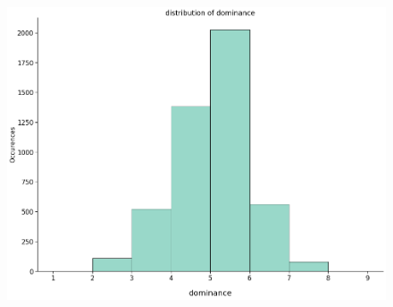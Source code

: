 \documentclass[a4paper,11pt,dvipsnames]{article}
\begin{document}
\begin{figure}[ht]
\begin{minipage}[b]{.3\linewidth}
\centering\includegraphics[width=0.9\linewidth]{Graphs/dominance_distribution.png}\label{fig:domdis}
\end{minipage}


\end{figure}
\end{document}
